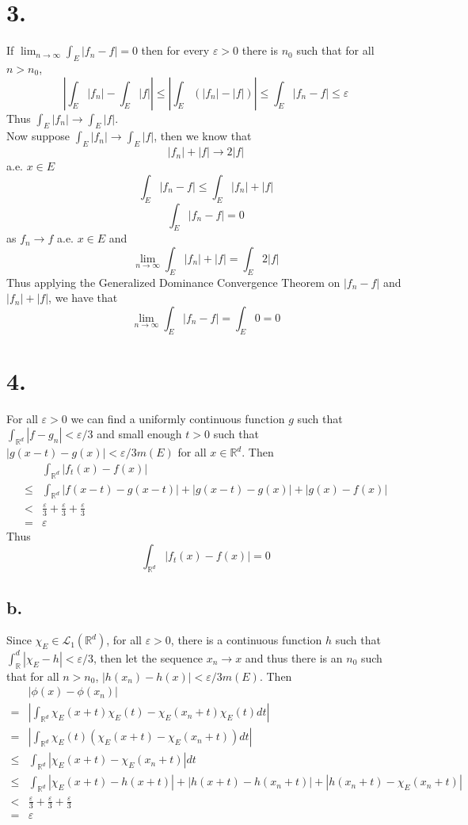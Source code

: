 \documentclass[11pt]{article}
\theoremstyle{mystyle}
\theoremstyle{definition}
\begin{document}
\section*{3.}
If $\lim_{n \to \infty} \int_E |f_n - f| = 0$ then for every $\varepsilon > 0$ there is $n_0$ such that for all $n > n_0$,  
\[
  \left|\int_E |f_n| - \int_E |f|\right| \le \left|\int_E (|f_n| - |f|) \right| \le  \int_E |f_n - f| \le \varepsilon
\]
Thus $\int_E |f_n| \to \int_E |f|$. \\
Now suppose $\int_E |f_n| \to \int_E |f|$, then we know that 
\[ 
  |f_n| + |f| \to 2|f|
\] 
a.e. $x \in E$  
\[
  \int_E |f_n - f| \le \int_E |f_n| + |f|
\] 
\[
  \int_E |f_n - f| = 0
\]
as $f_n \to f$ a.e. $x \in E$ and 
\[
  \lim_{n \to \infty} \int_E |f_n| + |f| = \int_E 2|f|
\]
Thus applying the Generalized Dominance Convergence Theorem on $|f_n - f|$ and $|f_n|+|f|$, we have that 
\[
  \lim_{n \to \infty} \int_E |f_n - f| = \int_E 0 = 0
\]
\newpage
\section*{4.}
For all $\varepsilon >0 $ we can find a uniformly continuous function $g$ such that $\int_{\mathbb{R}^d} |f-g_n| < \varepsilon/3$ and small enough $t>0$ such that $|g(x-t) - g(x)| < \varepsilon / 3m(E)$ for all $x \in \mathbb{R}^d$. Then 
\begin{align*}
  & \int_{\mathbb{R}^d} |f_t(x) - f(x)| \\
  \le& \int_{\mathbb{R}^d} |f(x-t) - g(x-t)| + |g(x-t) - g(x)| + |g(x) - f(x)| \\
  <& \displaystyle\frac{\varepsilon}{3} + \displaystyle\frac{\varepsilon}{3} + \displaystyle\frac{\varepsilon}{3} \\
  =& \varepsilon
\end{align*}
Thus 
\[
  \int_{\mathbb{R}^d} |f_t(x) - f(x)| = 0
\]
\subsection*{b.}
Since $\chi_E \in \mathcal{L}_1(\mathbb{R}^d)$, for all $\varepsilon > 0$, there is a continuous function $h$ such that $\int_\mathbb{R}^d |\chi_E - h| < \varepsilon / 3$, then let the sequence $x_n \to x$ and thus there is an $n_0$ such that for all $n > n_0$, $|h(x_n) - h(x)| < \varepsilon/3m(E)$. Then
\begin{align*}
  & |\phi(x) - \phi(x_n)| \\
  =& \left| \int_{\mathbb{R}^d} \chi_E(x+t) \chi_E(t) - \chi_E(x_n+t) \chi_E(t) dt \right|\\
  =& \left|\int_{\mathbb{R}^d} \chi_E(t)\left( \chi_E(x+t) - \chi_E(x_n+t)  \right) dt \right| \\
  \le & \int_{\mathbb{R}^d} |\chi_E(x+t) - \chi_E(x_n+t) | dt \\
  \le & \int_{\mathbb{R}^d} |\chi_E(x+t) - h(x+t)| + |h(x+t) - h(x_n+t)| + |h(x_n+t) - \chi_E (x_n+t) | \\
  < & \displaystyle\frac{\varepsilon}{3} + \displaystyle\frac{\varepsilon}{3} + \displaystyle\frac{\varepsilon}{3} \\
  = & \varepsilon
\end{align*}
\end{document}
